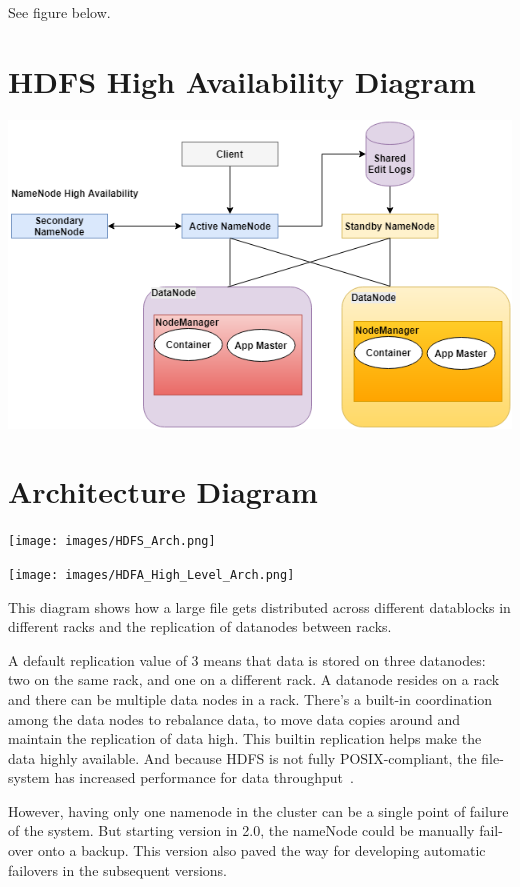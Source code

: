  See figure below.
 
\section{HDFS High Availability Diagram} 

\centering\includegraphics[width=\columnwidth]{images/HDFS_HA.png}

\section{Architecture Diagram} 

\centering\texttt{[image: images/HDFS\_Arch.png]}

\centering\texttt{[image: images/HDFA\_High\_Level\_Arch.png]}


This diagram shows how a large file gets distributed across 
different datablocks in different racks and the replication of
datanodes between racks.
 
A default replication value of 3 means that data is stored on three
datanodes: two on the same rack, and one on a different rack. A
datanode resides on a rack and there can be multiple data nodes in a
rack. There’s a built-in coordination among the data nodes to
rebalance data, to move data copies around and maintain the
replication of data high. This builtin replication helps make the
data highly available. And because HDFS is not fully POSIX-compliant,
the file-system has increased performance for data throughput~\cite{hid-sp18-506-hdfs2}.

However, having only one namenode in the cluster can be a single
point of failure of the system. But starting version in 2.0, the
nameNode could be manually fail-over onto a backup. This version
also paved the way for developing automatic failovers in the
subsequent versions.

